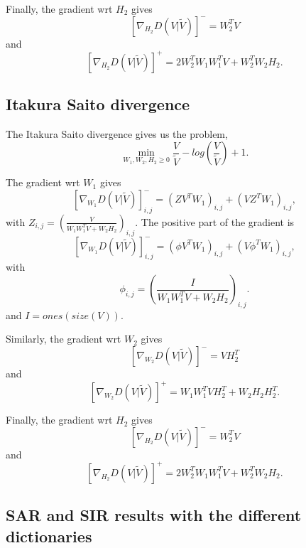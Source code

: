 \documentclass[journal]{IEEEtran}
\begin{document}
Finally, the gradient wrt $H_2$ gives
$$ [\nabla_{H_2} D(V|\tilde{V})]^{-} = W_2^TV  $$
and
$$ [\nabla_{H_2} D(V|\tilde{V})]^{+} = 2W_2^TW_1W_1^TV + W_2^TW_2H_2. $$

 
\subsection{Itakura Saito divergence}\label{ISdisteq}
The Itakura Saito divergence gives us the problem,
$$\min_{W_1,W_2,H_2 \geq 0} \frac{V}{\tilde{V}} - log(\frac{V}{\tilde{V}}) +1.$$

The gradient wrt $W_1$ gives
$$[\nabla_{W_1} D(V|\tilde{V})]_{i,j}^{-} = (ZV^TW_1)_{i,j} + (VZ^TW_1)_{i,j},$$
with $Z_{i,j} = (\frac{V}{W_1W_1^TV + W_2H_2})_{i,j}$. 
The positive part of the gradient is
$$[\nabla_{W_1} D(V|\tilde{V})]_{i,j}^{-} = (\phi V^TW_1)_{i,j} + (V \phi^T W_1)_{i,j},$$
with $$ \phi_{i,j} = (\frac{I}{W_1W_1^TV + W_2H_2})_{i,j}.$$ and $I = ones(size(V))$.


Similarly, the gradient wrt $W_2$ gives
$$ [\nabla_{W_2} D(V|\tilde{V})]^{-} = VH_2^T $$
and
$$ [\nabla_{W_2} D(V|\tilde{V})]^{+} = W_1W_1^TVH_2^T + W_2H_2H_2^T.$$

Finally, the gradient wrt $H_2$ gives
$$ [\nabla_{H_2} D(V|\tilde{V})]^{-} = W_2^TV  $$
and
$$ [\nabla_{H_2} D(V|\tilde{V})]^{+} = 2W_2^TW_1W_1^TV + W_2^TW_2H_2. $$



\subsection{SAR and SIR results with the different dictionaries}
\end{document}
